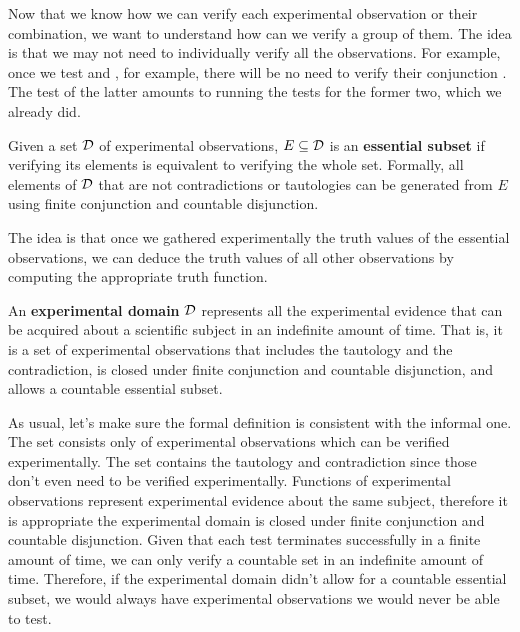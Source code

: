 \documentclass[11pt,letterpaper,fleqn]{memoir} %
\begin{document}
Now that we know how we can verify each experimental observation or their combination, we want to understand how can we verify a group of them. The idea is that we may not need to individually verify all the observations. For example, once we test  and , for example, there will be no need to verify their conjunction . The test of the latter amounts to running the tests for the former two, which we already did.

\begin{mathSection}
	\begin{defn}
		Given a set $\mathcal{D}$ of experimental observations, $E \subseteq \mathcal{D}$ is an \textbf{essential subset} if verifying its elements is equivalent to verifying the whole set. Formally, all elements of $\mathcal{D}$ that are not contradictions or tautologies can be generated from $E$ using finite conjunction and countable disjunction.
	\end{defn}
\end{mathSection}

The idea is that once we gathered experimentally the truth values of the essential observations, we can deduce the truth values of all other observations by computing the appropriate truth function.

\begin{mathSection}
\begin{defn}
	An \textbf{experimental domain} $\mathcal{D}$ represents all the experimental evidence that can be acquired about a scientific subject in an indefinite amount of time. That is, it is a set of experimental observations that includes the tautology and the contradiction, is closed under finite conjunction and countable disjunction, and allows a countable essential subset.
\end{defn}
\begin{justification}
	As usual, let's make sure the formal definition is consistent with the informal one. The set consists only of experimental observations which can be verified experimentally. The set contains the tautology and contradiction since those don't even need to be verified experimentally. Functions of experimental observations represent experimental evidence about the same subject, therefore it is appropriate the experimental domain is closed under finite conjunction and countable disjunction. Given that each test terminates successfully in a finite amount of time, we can only verify a countable set in an indefinite amount of time. Therefore, if the experimental domain didn't allow for a countable essential subset, we would always have experimental observations we would never be able to test.
\end{justification}
\end{mathSection}
\end{document}
